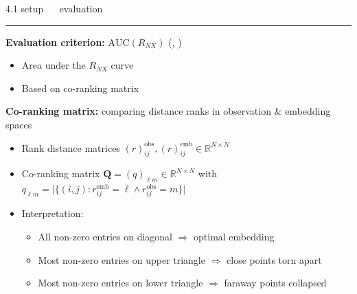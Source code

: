 \documentclass[11pt, compress, t, notes = noshow, xcolor = table, 
aspectratio = 1610]{beamer}
\newcommand{\highlight}[1]{\textcolor{highlightcol}{\textbf{#1}}}
\newcommand{\arritem}{\item[\highlight{$\rightarrow$}]}
\newcommand{\flexitem}[1]{\item[$\highlight{#1}$]}
\newcommand{\R}{\mathbb{R}}
\begin{document}
\LARGE
\begin{frame}{\textcolor{gray!90}{4.1 setup} ~~ evaluation}
\normalsize
\vspace{-0.5cm}
\noindent \textcolor{gray!90}{\rule{\textwidth}{1pt}}
\smallskip

\textbf{Evaluation criterion:} $\text{AUC}(R_{NX})$ 
(\citet{kraemeretal2019}, \citet{lueksetal2011})

\begin{itemize}
  \arritem Area under the $R_{NX}$ curve
  \arritem Based on co-ranking matrix
\end{itemize}

\vspace{0.3cm}

\textbf{Co-ranking matrix:} comparing distance ranks in observation \& embedding 
spaces

\begin{itemize}
  \arritem Rank distance matrices $(r)_{ij}^{\text{obs}}, (r)_{ij}^{\text{emb}} 
  \in \R^{N \times N}$
  \arritem Co-ranking matrix $\bm{Q} = (q)_{\ell m} \in \R^{N \times N}$ with 
  $q_{\ell m} = 
  \big \rvert \{ (i, j): 
  r_{ij}^{\text{emb}} = \ell \land r_{ij}^{\text{obs}} = m \} \big \rvert$ 
  \arritem Interpretation:
  \begin{itemize}
    \flexitem{1} All non-zero entries on diagonal $\Rightarrow$ optimal 
    embedding
    \flexitem{2} Most non-zero entries on upper triangle $\Rightarrow$ close 
    points torn apart
    \flexitem{3} Most non-zero entries on lower triangle $\Rightarrow$ faraway 
    points collapsed
  \end{itemize}
\end{itemize}

\end{frame}

\end{document}
